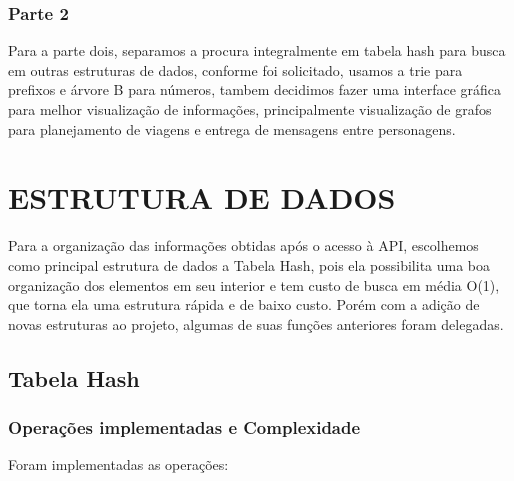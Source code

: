 \documentclass[12pt,a4paper]{article}
\begin{document}
\subsubsection{Parte 2}
Para a parte dois, separamos a procura integralmente em tabela hash para busca em outras estruturas de dados, conforme foi solicitado, usamos a trie para prefixos e árvore B para números, tambem decidimos fazer uma interface gráfica para melhor visualização de informações, principalmente visualização de grafos para planejamento de viagens e entrega de mensagens entre personagens.

\section{ESTRUTURA DE DADOS}

 Para a organização das informações obtidas após o acesso à API, escolhemos como principal estrutura de dados a Tabela Hash, pois ela possibilita uma boa organização dos elementos em seu interior e tem custo de busca em média O(1), que torna ela uma estrutura rápida e de baixo custo. Porém com a adição de novas estruturas ao projeto, algumas de suas funções anteriores foram delegadas.
 
 \subsection{Tabela Hash}

\subsubsection{Operações implementadas e Complexidade}
Foram implementadas as operações:
\end{document}

